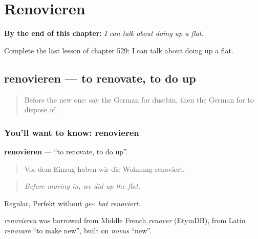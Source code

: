 
\chapter{Renovieren}
\label{ch:ge-renovieren}

\begin{chapteropening}
\textbf{By the end of this chapter:} \emph{I can talk about doing up a flat.}

Complete the last lesson of chapter 529: I can talk about doing up a flat.
\end{chapteropening}

\section[renovieren]{renovieren — to renovate, to do up}

\label{lesson:GE-C529-renovieren}



\begin{quote}
Before the new one: say the German for dustbin, then the German for to dispose of.
\end{quote}

\subsection*{You'll want to know: renovieren}
\textbf{renovieren} — \textquotedblleft{}to renovate, to do up\textquotedblright{}.

\begin{quote}
Vor dem Einzug haben wir die Wohnung renoviert.
\end{quote}

\begin{quote}
\emph{Before moving in, we did up the flat.}
\end{quote}

Regular, Perfekt without \emph{ge-}: \emph{hat renoviert}.

\begin{cousinweb}
\emph{renovieren} was borrowed from Middle French \emph{renover} (EtymDB), from Latin \emph{renovāre} \textquotedblleft{}to make new\textquotedblright{}, built on \emph{novus} \textquotedblleft{}new\textquotedblright{}.
\end{cousinweb}


